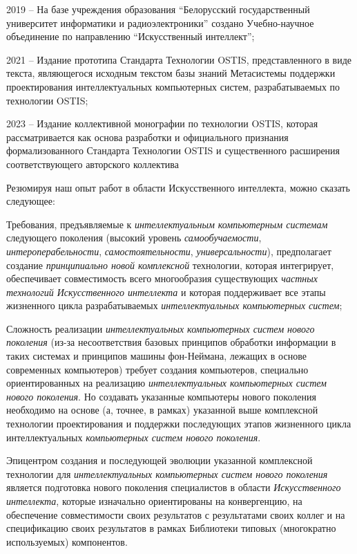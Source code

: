 \begin{textitemize}
\item 2019 -- На базе учреждения образования ``Белорусский государственный университет информатики и радиоэлектроники'' создано Учебно-научное объединение по направлению ``Искусственный интеллект'';
\item 2021 -- Издание прототипа  Стандарта Технологии OSTIS, представленного в виде  текста, являющегося исходным текстом базы знаний Метасистемы поддержки проектирования интеллектуальных компьютерных систем, разрабатываемых по технологии OSTIS;
\item 2023 -- Издание коллективной монографии по технологии OSTIS, которая рассматривается как основа разработки и официального признания формализованного Стандарта Технологии OSTIS и существенного расширения соответствующего авторского коллектива
\end{textitemize}

Резюмируя наш опыт работ в области Искусственного интеллекта, можно сказать следующее:

\begin{textitemize}
	\item
	Требования, предъявляемые к \textit{интеллектуальным компьютерным системам} следующего поколения (высокий уровень \textit{самообучаемости}, \textit{интероперабельности}, \textit{самостоятельности}, \textit{универсальности}), предполагает создание \textit{принципиально новой комплексной} технологии, которая интегрирует, обеспечивает совместимость всего многообразия существующих \textit{частных технологий Искусственного интеллекта} и которая поддерживает все этапы жизненного цикла разрабатываемых \textit{интеллектуальных компьютерных систем};
	\item
	Сложность реализации \textit{интеллектуальных компьютерных систем нового поколения} (из-за несоответствия базовых принципов обработки информации в таких системах и принципов машины фон-Неймана, лежащих в основе современных компьютеров) требует создания компьютеров, специально ориентированных на реализацию \textit{интеллектуальных компьютерных систем нового поколения}. Но создавать указанные компьютеры нового поколения необходимо на основе (а, точнее, в рамках) указанной выше комплексной технологии проектирования и поддержки последующих этапов жизненного цикла интеллектуальных \textit{компьютерных систем нового поколения}.
	\item
	Эпицентром создания и последующей эволюции указанной комплексной технологии для \textit{интеллектуальных компьютерных систем нового поколения} является подготовка нового поколения специалистов в области \textit{Искусственного интеллекта}, которые изначально ориентированы на конвергенцию, на обеспечение совместимости своих результатов с результатами своих коллег и на спецификацию своих результатов в рамках Библиотеки типовых (многократно используемых) компонентов.
\end{textitemize}


